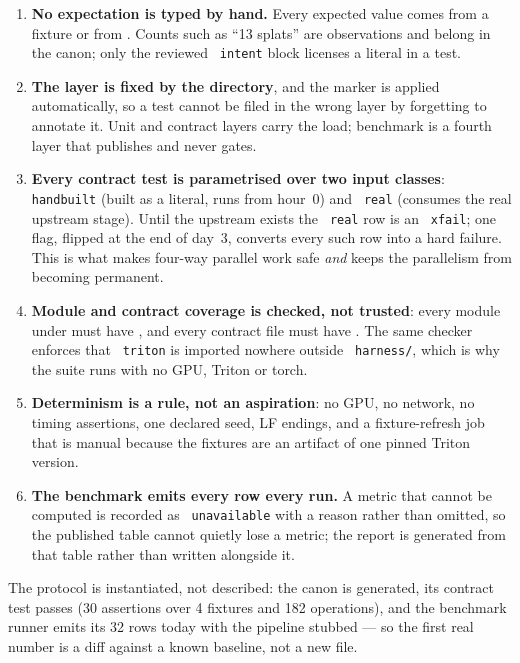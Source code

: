 \documentclass[11pt,a4paper]{article}
\newcommand{\code}[1]{\texttt{\small\hyphenchar\font=45 #1}}
\begin{document}
\begin{enumerate}[leftmargin=1.5em,itemsep=0.22em]
\item \textbf{No expectation is typed by hand.} Every expected value comes from a fixture or from
      . Counts such as ``13 splats'' are observations and belong in the canon; only the
      reviewed \code{intent} block licenses a literal in a test.
\item \textbf{The layer is fixed by the directory}, and the marker is applied automatically, so a test cannot
      be filed in the wrong layer by forgetting to annotate it. Unit and contract layers carry the load;
      benchmark is a fourth layer that publishes and never gates.
\item \textbf{Every contract test is parametrised over two input classes}: \code{handbuilt} (built as a
      literal, runs from hour~0) and \code{real} (consumes the real upstream stage). Until the upstream
      exists the \code{real} row is an \code{xfail}; one flag, flipped at the end of day~3, converts every
      such row into a hard failure. This is what makes four-way parallel work safe \emph{and} keeps the
      parallelism from becoming permanent.
\item \textbf{Module and contract coverage is checked, not trusted}: every module under
       must have , and every contract file must have
      . The same checker enforces that \code{triton} is imported nowhere
      outside \code{harness/}, which is why the suite runs with no GPU, Triton or torch.
\item \textbf{Determinism is a rule, not an aspiration}: no GPU, no network, no timing assertions, one
      declared seed, LF endings, and a fixture-refresh job that is manual because the fixtures are an
      artifact of one pinned Triton version.
\item \textbf{The benchmark emits every row every run.} A metric that cannot be computed is recorded as
      \code{unavailable} with a reason rather than omitted, so the published table cannot quietly lose a
      metric; the report is generated from that table rather than written alongside it.
\end{enumerate}

\noindent The protocol is instantiated, not described: the canon is generated, its contract test passes (30
assertions over 4 fixtures and 182 operations), and the benchmark runner emits its 32 rows today with the
pipeline stubbed --- so the first real number is a diff against a known baseline, not a new file.
\end{document}
